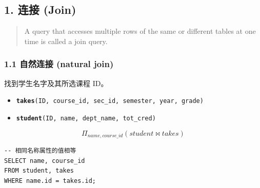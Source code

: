 \documentclass[aspectratio=169, 14pt]{beamer}
\begin{document}
{
    \begin{frame}
        \section{\textcolor{darkmidnightblue}{1. 连接 (Join)}}

        \begin{quote}
            A query that accesses multiple rows of the same or different tables at one time is called a \alert{join query}.            
        \end{quote}
    \end{frame}

}

\begin{frame}[fragile]
    \frametitle{1.1 自然连接 (natural join)}
找到学生名字及其所选课程 ID。   

\begin{itemize}
    \item \texttt{\textbf{takes}(ID, course\_id, sec\_id, semester, year, grade)}
    \item  \texttt{\textbf{student}(ID, name, dept\_name, tot\_cred)}
\end{itemize}
\[\Pi_{name, course\_id}(student \Join takes)\] 

\pause
\begin{verbatim}
-- 相同名称属性的值相等
SELECT name, course_id
FROM student, takes
WHERE name.id = takes.id;
\end{verbatim}

\end{frame}
\end{document}
